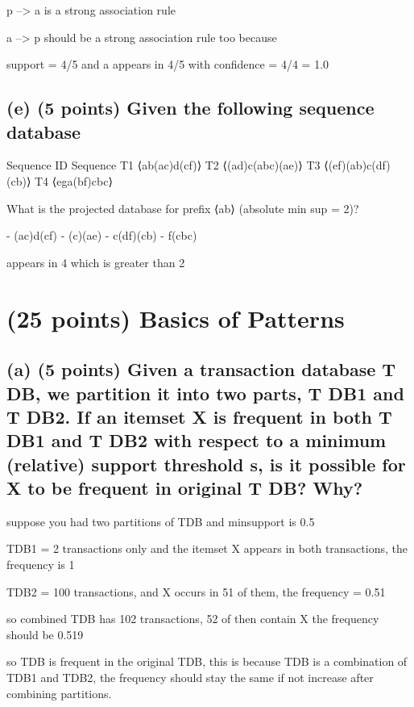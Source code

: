 \documentclass[
]{article}
\begin{document}
p --\textgreater{} a is a strong association rule

a --\textgreater{} p should be a strong association rule too because

support = 4/5 and a appears in 4/5 with confidence = 4/4 = 1.0

\subsection{(e) (5 points) Given the following sequence
database}\label{e-5-points-given-the-following-sequence-database}

Sequence ID Sequence T1 ⟨ab(ac)d(cf)⟩ T2 ⟨(ad)c(abc)(ae)⟩ T3
⟨(ef)(ab)c(df)(cb)⟩ T4 ⟨ega(bf)cbc⟩

What is the projected database for prefix ⟨ab⟩ (absolute min sup = 2)?

- (ac)d(cf) - (c)(ae) - c(df)(cb) - f(cbc)

appears in 4 which is greater than 2

\section{(25 points) Basics of
Patterns}\label{points-basics-of-patterns}

\subsection{(a) (5 points) Given a transaction database T DB, we
partition it into two parts, T DB1 and T DB2. If an itemset X is
frequent in both T DB1 and T DB2 with respect to a minimum (relative)
support threshold s, is it possible for X to be frequent in original T
DB?
Why?}\label{a-5-points-given-a-transaction-database-t-db-we-partition-it-into-two-parts-t-db1-and-t-db2.-if-an-itemset-x-is-frequent-in-both-t-db1-and-t-db2-with-respect-to-a-minimum-relative-support-threshold-s-is-it-possible-for-x-to-be-frequent-in-original-t-db-why}

suppose you had two partitions of TDB and minsupport is 0.5

TDB1 = 2 transactions only and the itemset X appears in both
transactions, the frequency is 1

TDB2 = 100 transactions, and X occurs in 51 of them, the frequency =
0.51

so combined TDB has 102 transactions, 52 of then contain X the frequency
should be 0.519

so TDB is frequent in the original TDB, this is because TDB is a
combination of TDB1 and TDB2, the frequency should stay the same if not
increase after combining partitions.
\end{document}
